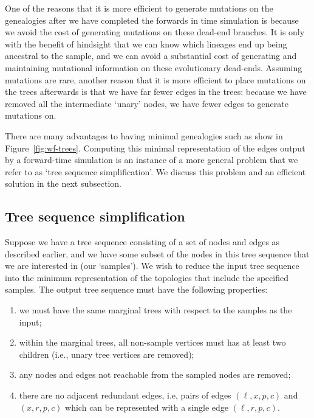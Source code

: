 \documentclass{article}
\begin{document}
One of the reasons that it is more efficient to generate mutations on the
genealogies after we have completed the forwards in time simulation is
because we avoid the cost of generating mutations on these dead-end branches.
It is only with the benefit of hindsight that we can know which lineages end
up being ancestral to the sample, and we can avoid a substantial cost of
generating and maintaining mutational information on these evolutionary
dead-ends. Assuming mutations are rare, another  reason that it is more efficient
to place mutations on the trees afterwards is that we have far fewer edges
in the trees: because we have removed all the intermediate `unary' nodes, we
have fewer edges to generate mutations on.

There are many advantages to having minimal genealogies such as show in
Figure~\ref{fig:wf-trees}. Computing this minimal representation of the
edges output by a forward-time simulation is an instance of a more
general problem that we refer to as `tree sequence simplification'. We discuss
this problem and an efficient solution in the next subsection.

\subsection*{Tree sequence simplification}

Suppose we have a tree sequence consisting of a set of nodes and edges as
described earlier, and we have some subset of the nodes in this tree sequence
that we are interested in (our `samples').  We wish to reduce the input tree sequence
into the minimum representation of the topologies that include the specified
samples. The output tree sequence must have the following properties:
\begin{enumerate}
\item we must have the same marginal trees with respect to the samples as
the input;
\item within the marginal trees, all non-sample vertices must has at least
two children (i.e., unary tree vertices are removed);
\item any nodes and edges not reachable from the sampled nodes are removed;
\item there are no adjacent redundant edges, i.e, pairs of edges $(\ell, x, p,
c)$ and $(x, r, p, c)$ which can be represented with a single edge
$(\ell, r, p, c)$.
\end{enumerate}
\end{document}
